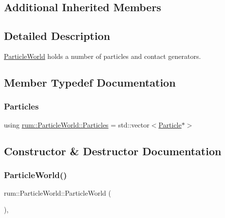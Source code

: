 \subsection*{Additional Inherited Members}


\subsection{Detailed Description}
\mbox{\hyperlink{classrum_1_1_particle_world}{Particle\+World}} holds a number of particles and contact generators. 

\subsection{Member Typedef Documentation}
\mbox{\label{classrum_1_1_particle_world_ac172daef7c571097de59488881afa300}} 
\subsubsection{\texorpdfstring{Particles}{Particles}}
{\footnotesize\ttfamily using \mbox{\hyperlink{classrum_1_1_particle_world_ac172daef7c571097de59488881afa300}{rum\+::\+Particle\+World\+::\+Particles}} =  std\+::vector$<$\mbox{\hyperlink{classrum_1_1_particle}{Particle}}$\ast$$>$}



\subsection{Constructor \& Destructor Documentation}
\mbox{\label{classrum_1_1_particle_world_a0d7219eaf6dd890981944e884e906390}} 
\subsubsection{\texorpdfstring{Particle\+World()}{ParticleWorld()}}
{\footnotesize\ttfamily rum\+::\+Particle\+World\+::\+Particle\+World (\begin{DoxyParamCaption}{ }\end{DoxyParamCaption})\hspace{0.3cm}{\ttfamily [explicit]}, {\ttfamily [default]}}

